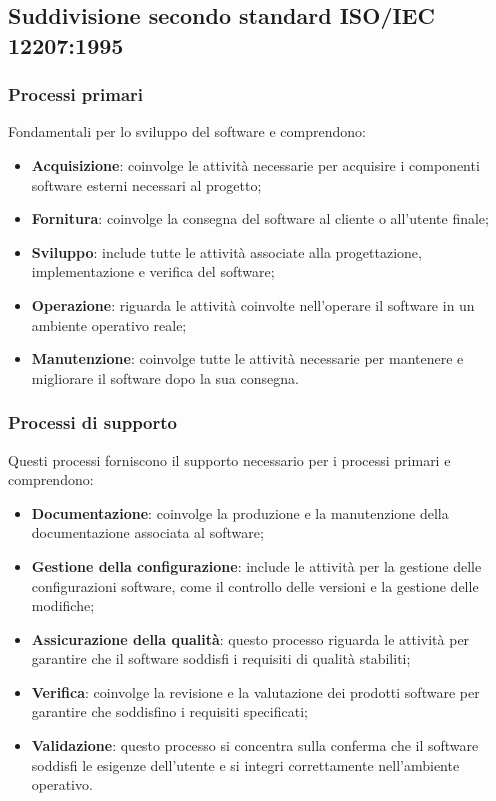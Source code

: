 \subsection{Suddivisione secondo standard ISO/IEC 12207:1995}
\subsubsection{Processi primari}
Fondamentali per lo sviluppo del software e comprendono:
\begin{itemize}
    \item \textbf{Acquisizione}: coinvolge le attività necessarie per acquisire i componenti software esterni necessari al progetto;
    \item \textbf{Fornitura}: coinvolge la consegna del software al cliente o all'utente finale;
    \item \textbf{Sviluppo}: include tutte le attività associate alla progettazione, implementazione e verifica del software;
    \item \textbf{Operazione}: riguarda le attività coinvolte nell'operare il software in un ambiente operativo reale;
    \item \textbf{Manutenzione}: coinvolge tutte le attività necessarie per mantenere e migliorare il software dopo la sua consegna.
\end{itemize}
\subsubsection{Processi di supporto}
Questi processi forniscono il supporto necessario per i processi primari e comprendono:
\begin{itemize}
    \item \textbf{Documentazione}: coinvolge la produzione e la manutenzione della documentazione associata al software;
    \item \textbf{Gestione della configurazione}: include le attività per la gestione delle configurazioni software, come il controllo delle versioni e la gestione delle modifiche;
    \item \textbf{Assicurazione della qualità}: questo processo riguarda le attività per garantire che il software soddisfi i requisiti di qualità stabiliti;
    \item \textbf{Verifica}: coinvolge la revisione e la valutazione dei prodotti software per garantire che soddisfino i requisiti specificati;
    \item \textbf{Validazione}: questo processo si concentra sulla conferma che il software soddisfi le esigenze dell'utente e si integri correttamente nell'ambiente operativo.
\end{itemize}
